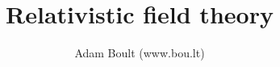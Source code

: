 \documentclass[oneside]{book}
\begin{document}
\author{Adam Boult (www.bou.lt)}
\title{Relativistic field theory}
\maketitle

\setcounter{tocdepth}{0}
\tableofcontents


\end{document}
